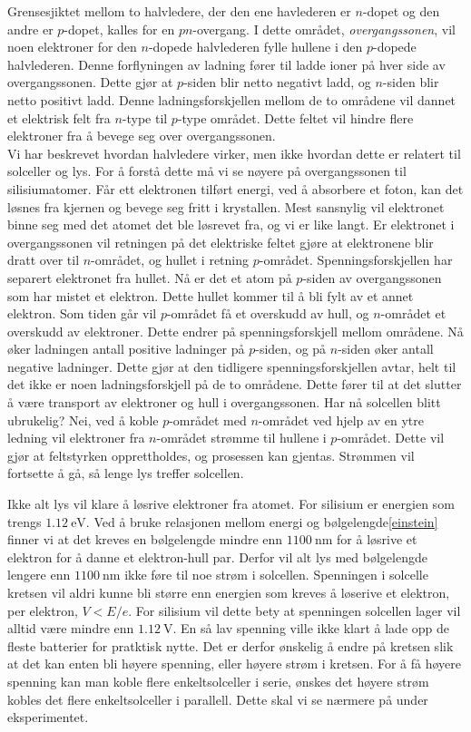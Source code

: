 \documentclass[%
 reprint,
 amsmath,amssymb,
 aps,
 norsk,
 booktabs
]{revtex4-1}
\begin{document}
Grensesjiktet mellom to halvledere, der den ene havlederen er $n$-dopet og den andre er $p$-dopet, kalles for en $pn$-overgang. I dette området, \textit{overgangssonen}, vil noen elektroner for den $n$-dopede halvlederen fylle hullene i den $p$-dopede halvlederen. Denne forflyningen av ladning fører til ladde ioner på hver side av overgangssonen. Dette gjør at $p$-siden blir netto negativt ladd, og $n$-siden blir netto positivt ladd. Denne ladningsforskjellen mellom de to områdene vil dannet et elektrisk felt fra $n$-type til $p$-type området. Dette feltet vil hindre flere elektroner fra å bevege seg over overgangssonen.\\
Vi har beskrevet hvordan halvledere virker, men ikke hvordan dette er relatert til solceller og lys. For å  forstå dette må vi se nøyere på overgangssonen til silisiumatomer. Får ett elektronen tilført energi, ved å absorbere et foton, kan det løsnes fra kjernen og bevege seg fritt i krystallen. Mest sansnylig vil elektronet binne seg med det atomet det ble løsrevet fra, og vi er like langt. Er elektronet i overgangssonen vil retningen på det elektriske feltet gjøre at elektronene blir dratt over til $n$-området, og hullet i retning $p$-området. Spenningsforskjellen har separert elektronet fra hullet. Nå er det et atom på $p$-siden av overgangssonen som har mistet et elektron. Dette hullet kommer til å bli fylt av et annet elektron. Som tiden går vil $p$-området få et overskudd av hull, og $n$-området et overskudd av elektroner. Dette endrer på spenningsforskjell mellom områdene. Nå øker ladningen antall positive ladninger på $p$-siden, og på $n$-siden øker antall negative ladninger. Dette gjør at den tidligere spenningsforskjellen avtar, helt til det ikke er noen ladningsforskjell på de to områdene. Dette fører til at det slutter å være transport av elektroner og hull i overgangssonen. Har nå solcellen blitt ubrukelig? Nei, ved å koble $p$-området med $n$-området ved hjelp av en ytre ledning vil elektroner fra $n$-området strømme til hullene i $p$-området. Dette vil gjør at feltstyrken opprettholdes, og prosessen kan gjentas. Strømmen vil fortsette å gå, så lenge lys treffer solcellen.\par
Ikke alt lys vil klare å løsrive elektroner fra atomet. For silisium er energien som trengs $\SI{1.12}{\electronvolt}$. Ved å bruke relasjonen mellom energi og bølgelengde\eqref{einstein} finner vi at det kreves en bølgelengde mindre enn $\SI{1100}{\nano\meter}$ for å løsrive et elektron for å danne et elektron-hull par. Derfor vil alt lys med bølgelengde lengere enn $\SI{1100}{\nano\meter}$ ikke føre til noe strøm i solcellen. Spenningen i solcelle kretsen vil aldri kunne bli større enn energien som kreves å løserive et elektron, per elektron, $V<E/e$. For silisium vil dette bety at spenningen solcellen lager vil alltid være mindre enn $\SI{1.12}{\volt}$. En så lav spenning ville ikke klart å lade opp de fleste batterier for pratktisk nytte. Det er derfor ønskelig å endre på kretsen slik at det kan enten bli høyere spenning, eller høyere strøm i kretsen. For å få høyere spenning kan man koble flere enkeltsolceller i serie, ønskes det høyere strøm kobles det flere enkeltsolceller i parallell. Dette skal vi se nærmere på under eksperimentet.
\end{document}
